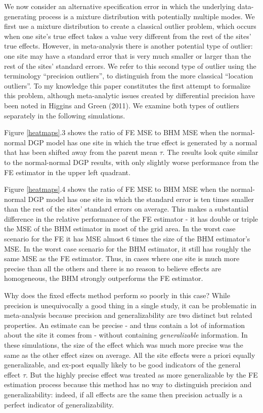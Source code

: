 \documentclass[12pt]{article}
\begin{document}
We now consider an alternative specification error in which the underlying data-generating process is a mixture distribution with potentially multiple modes. We first use a mixture distribution to create a classical outlier problem, which occurs when one site's true effect takes a value very different from the rest of the sites' true effects. However, in meta-analysis there is another potential type of outlier: one site may have a standard error that is very much smaller or larger than the rest of the sites' standard errors. We refer to this second type of outlier using the terminology ``precision outliers'', to distinguish from the more classical ``location outliers''. To my knowledge this paper constitutes the first attempt to formalize this problem, although meta-analytic issues created by differential precision have been noted in Higgins and Green (2011). We examine both types of outliers separately in the following simulations. 

Figure \ref{heatmaps}.3 shows the ratio of FE MSE to BHM MSE when the normal-normal DGP model has one site in which the true effect is generated by a normal that has been shifted away from the parent mean $\tau$. The results look quite similar to the normal-normal DGP results, with only slightly worse performance from the FE estimator in the upper left quadrant.

Figure \ref{heatmaps}.4 shows the ratio of FE MSE to BHM MSE when the normal-normal DGP model has one site in which the standard error is ten times smaller than the rest of the sites' standard errors on average. This makes a substantial difference in the relative performance of the FE estimator - it has double or triple the MSE of the BHM estimator in most of the grid area. In the worst case scenario for the FE it has MSE almost 6 times the size of the BHM estimator's MSE. In the worst case scenario for the BHM estimator, it still has roughly the same MSE as the FE estimator. Thus, in cases where one site is much more precise than all the others and there is no reason to believe effects are homogeneous, the BHM strongly outperforms the FE estimator.

Why does the fixed effects method perform so poorly in this case? While precision is unequivocally a good thing in a single study, it can be problematic in meta-analysis because precision and generalizability are two distinct but related properties. An estimate can be precise - and thus contain a lot of information about the site it comes from - without containing \emph{generalizable} information. In these simulations, the size of the effect which was much more precise was the same as the other effect sizes on average. All the site effects were a priori equally generalizable, and ex-post equally likely to be good indicators of the general effect $\tau$. But the highly precise effect was treated as more generalizable by the FE estimation process because this method has no way to distinguish precision and generalizability: indeed, if all effects are the same then precision actually is a perfect indicator of generalizability. 
\end{document}
